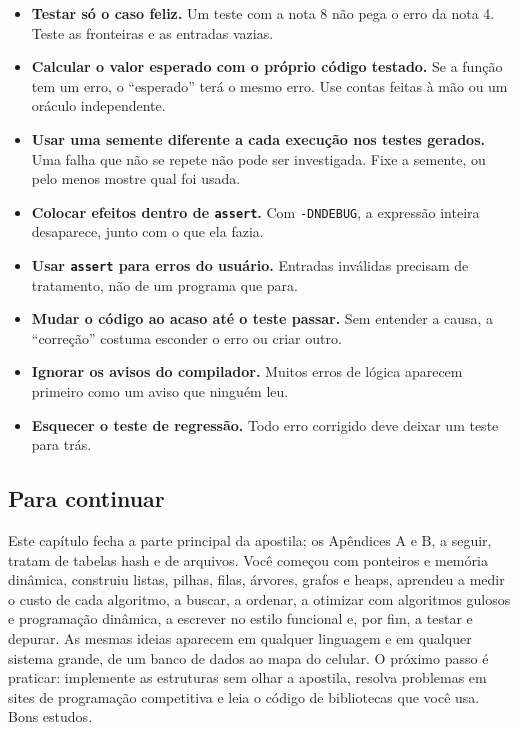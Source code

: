 \begin{itemize}
  \item \textbf{Testar só o caso feliz.} Um teste com a nota 8 não pega o erro da nota 4. Teste as fronteiras e as entradas vazias.
  \item \textbf{Calcular o valor esperado com o próprio código testado.} Se a função tem um erro, o ``esperado'' terá o mesmo erro. Use contas feitas à mão ou um oráculo independente.
  \item \textbf{Usar uma semente diferente a cada execução nos testes gerados.} Uma falha que não se repete não pode ser investigada. Fixe a semente, ou pelo menos mostre qual foi usada.
  \item \textbf{Colocar efeitos dentro de \texttt{assert}.} Com \texttt{-DNDEBUG}, a expressão inteira desaparece, junto com o que ela fazia.
  \item \textbf{Usar \texttt{assert} para erros do usuário.} Entradas inválidas precisam de tratamento, não de um programa que para.
  \item \textbf{Mudar o código ao acaso até o teste passar.} Sem entender a causa, a ``correção'' costuma esconder o erro ou criar outro.
  \item \textbf{Ignorar os avisos do compilador.} Muitos erros de lógica aparecem primeiro como um aviso que ninguém leu.
  \item \textbf{Esquecer o teste de regressão.} Todo erro corrigido deve deixar um teste para trás.
\end{itemize}

\subsection{Para continuar}

Este capítulo fecha a parte principal da apostila; os Apêndices A e B, a seguir, tratam de tabelas hash e de arquivos. Você começou com ponteiros e memória dinâmica, construiu listas, pilhas, filas, árvores, grafos e heaps, aprendeu a medir o custo de cada algoritmo, a buscar, a ordenar, a otimizar com algoritmos gulosos e programação dinâmica, a escrever no estilo funcional e, por fim, a testar e depurar. As mesmas ideias aparecem em qualquer linguagem e em qualquer sistema grande, de um banco de dados ao mapa do celular. O próximo passo é praticar: implemente as estruturas sem olhar a apostila, resolva problemas em sites de programação competitiva e leia o código de bibliotecas que você usa. Bons estudos.
